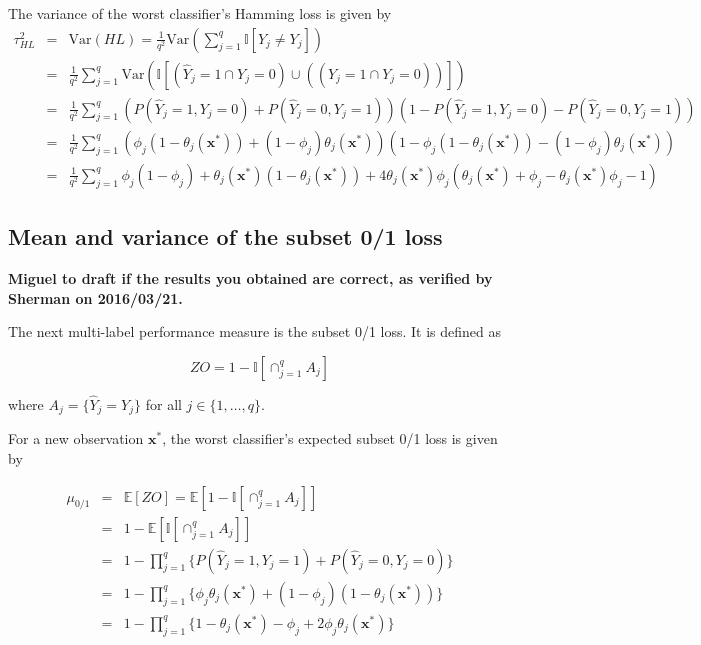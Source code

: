 \documentclass[review]{elsarticle}
\begin{document}
The variance of the worst classifier's Hamming loss is given by
\begin{eqnarray*}
\tau^{2}_{HL} &=& \mathrm{Var}(HL) = \frac{1}{q^{2}} \mathrm{Var} \left( \sum^{q}_{j=1}{\mathbb{I} [\hat{Y}_{j} \neq Y_{j}]} \right) \\
&=& \frac{1}{q^{2}} \sum^{q}_{j=1}{\mathrm{Var} \left( \mathbb{I} [(\hat{Y}_{j} = 1 \cap Y_{j} = 0) \cup ((\hat{Y}_{j} = 1 \cap Y_{j} = 0)) ] \right)} \\
&=& \frac{1}{q^{2}} \sum^{q}_{j=1}{\left( P(\hat{Y}_{j}=1,Y_{j}=0) + P(\hat{Y}_{j}=0,Y_{j}=1) \right) \left(1 - P(\hat{Y}_{j}=1,Y_{j}=0) - P(\hat{Y}_{j}=0,Y_{j}=1) \right)} \\
&=& \frac{1}{q^{2}} \sum^{q}_{j=1}{\left(\phi_{j} (1 - \theta_{j}(\mathbf{x}^{*})) + (1 - \phi_{j})\theta_{j}(\mathbf{x^{*}}) \right) \left( 1 - \phi_{j} (1 - \theta_{j}(\mathbf{x}^{*})) - (1 - \phi_{j})\theta_{j}(\mathbf{x}^{*}) \right)} \\
&=& \frac{1}{q^{2}} \sum^{q}_{j=1}{\phi_{j} (1 - \phi_{j})} + \theta_{j}(\mathbf{x}^{*})(1 - \theta_{j}(\mathbf{x}^{*})) + 4\theta_{j}(\mathbf{x}^{*}) \phi_{j} \left( \theta_{j}(\mathbf{x}^{*}) + \phi_{j} - \theta_{j}(\mathbf{x}^{*}) \phi_{j} - 1 \right)
\end{eqnarray*}


\subsection{Mean and variance of the subset 0/1 loss}\label{ss:01}

{\bf Miguel to draft if the results you obtained are correct, as verified by Sherman on 2016/03/21.}

The next multi-label performance measure is the subset 0/1 loss. It is defined as

\begin{equation}
ZO = 1 - \mathbb{I}\left[ \cap^{q}_{j=1}A_{j} \right]
\end{equation}

where $A_{j}=\{ \hat{Y}_{j} = Y_{j} \}$ for all $j \in \{ 1,\ldots,q\}$.

For a new observation $\mathbf{x}^{*}$, the worst classifier's expected subset 0/1 loss is given by

\begin{eqnarray*}
\mu_{0/1} &=& \mathbb{E} \left[ ZO \right] = \mathbb{E} \left[ 1 - \mathbb{I}\left[ \cap^{q}_{j=1}A_{j} \right] \right] \\
&=& 1 - \mathbb{E} \left[ \mathbb{I}\left[ \cap^{q}_{j=1}A_{j} \right] \right] \\
&=& 1 - \prod^{q}_{j=1}{ \{ P(\hat{Y}_{j}=1, Y_{j}=1) + P(\hat{Y}_{j}=0, Y_{j}=0) \} } \\
&=& 1 - \prod^{q}_{j=1}{ \{ \phi_{j} \theta_{j}(\mathbf{x}^{*}) + (1 - \phi_{j})(1 - \theta_{j}(\mathbf{x}^{*})) \} } \\
&=& 1 - \prod^{q}_{j=1}{ \{ 1 - \theta_{j}(\mathbf{x}^{*}) - \phi_{j} + 2 \phi_{j}\theta_{j}(\mathbf{x}^{*}) \}}
\end{eqnarray*}
\end{document}
